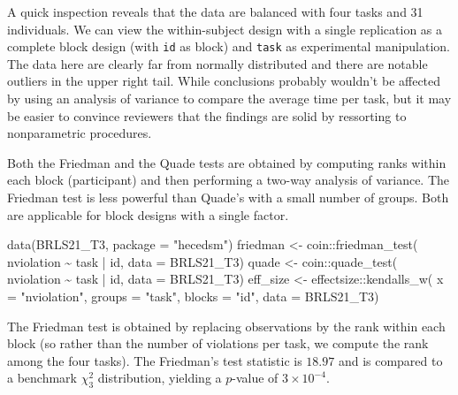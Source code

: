 \documentclass[
  11pt,
  letterpaper,
]{scrbook}
\newenvironment{Shaded}{\begin{snugshade}}{\end{snugshade}}
\newcommand{\AttributeTok}[1]{\textcolor[rgb]{0.40,0.45,0.13}{#1}}
\newcommand{\FunctionTok}[1]{\textcolor[rgb]{0.28,0.35,0.67}{#1}}
\newcommand{\NormalTok}[1]{\textcolor[rgb]{0.00,0.23,0.31}{#1}}
\newcommand{\OtherTok}[1]{\textcolor[rgb]{0.00,0.23,0.31}{#1}}
\newcommand{\SpecialCharTok}[1]{\textcolor[rgb]{0.37,0.37,0.37}{#1}}
\newcommand{\StringTok}[1]{\textcolor[rgb]{0.13,0.47,0.30}{#1}}
\theoremstyle{definition}
\theoremstyle{remark}
\begin{document}
A quick inspection reveals that the data are balanced with four tasks
and 31 individuals. We can view the within-subject design with a single
replication as a complete block design (with \texttt{id} as block) and
\texttt{task} as experimental manipulation. The data here are clearly
far from normally distributed and there are notable outliers in the
upper right tail. While conclusions probably wouldn't be affected by
using an analysis of variance to compare the average time per task, but
it may be easier to convince reviewers that the findings are solid by
ressorting to nonparametric procedures.

Both the Friedman and the Quade tests are obtained by computing ranks
within each block (participant) and then performing a two-way analysis
of variance. The Friedman test is less powerful than Quade's with a
small number of groups. Both are applicable for block designs with a
single factor.

\begin{Shaded}
\begin{Highlighting}[]
\FunctionTok{data}\NormalTok{(BRLS21\_T3, }\AttributeTok{package =} \StringTok{"hecedsm"}\NormalTok{)}
\NormalTok{friedman }\OtherTok{\textless{}{-}}\NormalTok{ coin}\SpecialCharTok{::}\FunctionTok{friedman\_test}\NormalTok{(}
\NormalTok{  nviolation }\SpecialCharTok{\textasciitilde{}}\NormalTok{ task }\SpecialCharTok{|}\NormalTok{ id,}
  \AttributeTok{data =}\NormalTok{ BRLS21\_T3)}
\NormalTok{quade }\OtherTok{\textless{}{-}}\NormalTok{ coin}\SpecialCharTok{::}\FunctionTok{quade\_test}\NormalTok{(}
\NormalTok{  nviolation }\SpecialCharTok{\textasciitilde{}}\NormalTok{ task }\SpecialCharTok{|}\NormalTok{ id,}
  \AttributeTok{data =}\NormalTok{ BRLS21\_T3)}
\NormalTok{eff\_size }\OtherTok{\textless{}{-}}\NormalTok{ effectsize}\SpecialCharTok{::}\FunctionTok{kendalls\_w}\NormalTok{(}
  \AttributeTok{x =} \StringTok{"nviolation"}\NormalTok{, }
  \AttributeTok{groups =} \StringTok{"task"}\NormalTok{, }
  \AttributeTok{blocks =} \StringTok{"id"}\NormalTok{, }
  \AttributeTok{data =}\NormalTok{ BRLS21\_T3)}
\end{Highlighting}
\end{Shaded}

The Friedman test is obtained by replacing observations by the rank
within each block (so rather than the number of violations per task, we
compute the rank among the four tasks). The Friedman's test statistic is
\(18.97\) and is compared to a benchmark \(\chi^2_3\) distribution,
yielding a \(p\)-value of \(\ensuremath{3\times 10^{-4}}\).
\end{document}
